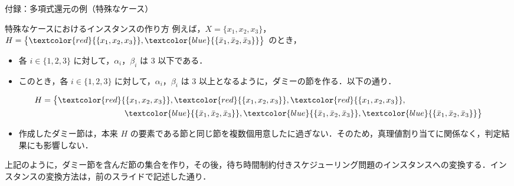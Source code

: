 \documentclass[dvipdfmx]{beamer}
\begin{document}
    \begin{frame}{付録：多項式還元の例（特殊なケース）}
      \begin{block}{特殊なケースにおけるインスタンスの作り方}
        例えば，$X = \{x_1,x_2,x_3\}$，$H = \big\{{\textcolor{red}{\{x_1,x_2,x_3\}}},{\textcolor{blue}{\{\bar x_1, \bar x_2, \bar x_3\}}}\big\}$ のとき，
        \begin{itemize}
          \item
          各 $i \in \{1,2,3\}$ に対して，$\alpha_i$，$\beta_i$ は 3 以下である．
          \item
          このとき，各 $i \in \{1,2,3\}$ に対して，$\alpha_i$，$\beta_i$ は 3 以上となるように，ダミーの節を作る．以下の通り．
        \end{itemize}
        \begin{equation}
          \begin{split}
            H &= \big\{
            {\textcolor{red}{\{x_1,x_2,x_3\}}},
            {\textcolor{red}{\{x_1,x_2,x_3\}}},
            {\textcolor{red}{\{x_1,x_2,x_3\}}},
            \\ & \qquad\qquad\qquad\qquad\qquad
            {\textcolor{blue}{\{\bar x_1, \bar x_2, \bar x_3\}}},
            {\textcolor{blue}{\{\bar x_1, \bar x_2, \bar x_3\}}},
            {\textcolor{blue}{\{\bar x_1, \bar x_2, \bar x_3\}}}
            \big\} \notag
          \end{split}
        \end{equation}
        \begin{itemize}
          \item 作成したダミー節は，本来 $H$ の要素である節と同じ節を複数個用意したに過ぎない．そのため，真理値割り当てに関係なく，判定結果にも影響しない．
        \end{itemize}
        上記のように，ダミー節を含んだ節の集合を作り，その後，待ち時間制約付きスケジューリング問題のインスタンスへの変換する．インスタンスの変換方法は，前のスライドで記述した通り．
      \end{block}
    \end{frame}

\end{document}
